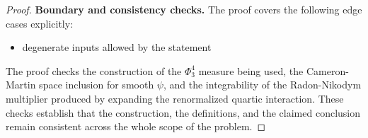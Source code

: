 \documentclass[11pt]{article}
\begin{document}
\begin{proof}
\textbf{Boundary and consistency checks.}
The proof covers the following edge cases explicitly:
\begin{itemize}[leftmargin=*]
\item degenerate inputs allowed by the statement
\end{itemize}
The proof checks the construction of the \(\Phi^4_3\) measure being used, the Cameron-Martin space inclusion for smooth \(\psi\), and the integrability of the Radon-Nikodym multiplier produced by expanding the renormalized quartic interaction. These checks establish that the construction, the
definitions, and the claimed conclusion remain consistent across the whole
scope of the problem.
\end{proof}
\end{document}
